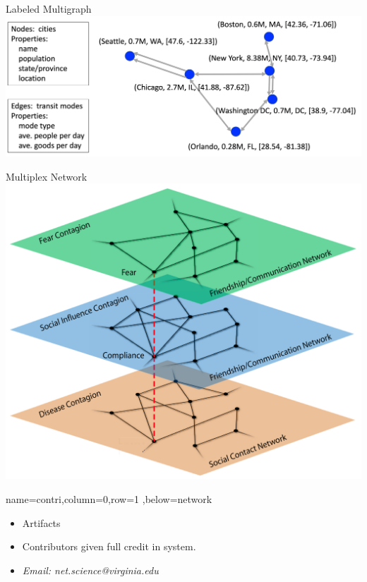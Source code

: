 \documentclass[landscape,paperwidth=70in,paperheight=46in,fontscale=0.225]{baposter} %
\begin{document}
\begin{poster}
{\begin{minipage}{.5\textwidth}        
Labeled Multigraph
\centering
\includegraphics[scale=0.22]{figures/single_net.png}
\end{minipage}
\hfill
 \begin{minipage}{.45\textwidth}      
 Multiplex Network
 \centering
\includegraphics[scale=0.3]{figures/multi_net.png}
\end{minipage}
}
          {name=contri,column=0,row=1 ,below=network}{
\begin{itemize}[leftmargin=*,noitemsep,topsep=0pt]
\item Artifacts
\item Contributors given full credit in system.
\item \textit{Email:  net.science@virginia.edu}
\end{itemize}

}
\end{poster}
\end{document}
